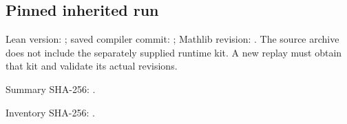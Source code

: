 \subsection{Pinned inherited run}
Lean version: ; saved compiler commit: ; Mathlib revision: . The source archive does not include the separately supplied runtime kit. A new replay must obtain that kit and validate its actual revisions.\par
Summary SHA-256: .\par
Inventory SHA-256: .\par
